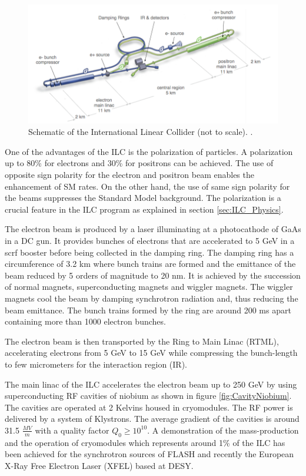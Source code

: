 \begin{figure}[htbp!]
  \centering
  \includegraphics[width=0.8\linewidth]{chap2/fig/ILC_schematic.png}
  \caption{Schematic of the International Linear Collider (not to scale). \cite{ILC_TDR_Vol1}.} \label{fig:ILC_schematic}
\end{figure}

One of the advantages of the ILC is the polarization of particles. A polarization up to 80\% for electrons and 30\% for positrons can be achieved. The use of opposite sign polarity for the electron and positron beam enables the enhancement of SM rates. On the other hand, the use of same sign polarity for the beams suppresses the Standard Model background. The polarization is a crucial feature in the ILC program as explained in section \ref{sec:ILC_Physics}.

The electron beam is produced by a laser illuminating at a photocathode of GaAs in a DC gun. It provides bunches of electrons that are accelerated to 5 GeV in a \acrshort{scrf} booster before being collected in the damping ring. The damping ring has a circumference of 3.2 km where bunch trains are formed and the emittance of the beam reduced by 5 orders of magnitude to 20 nm. It is achieved by the succession of normal magnets, superconducting magnets and wiggler magnets. The wiggler magnets cool the beam by damping synchrotron radiation and, thus reducing the beam emittance. The bunch trains formed by the ring are around 200 ms apart containing more than 1000 electron bunches.

The electron beam is then transported by the Ring to Main Linac (RTML), accelerating electrons from 5 GeV to 15 GeV while compressing the bunch-length to few micrometers for the interaction region (IR).

The main linac of the ILC accelerates the electron beam up to 250 GeV by using superconducting RF cavities of niobium as shown in figure \ref{fig:CavityNiobium}. The cavities are operated at 2 Kelvins housed in cryomodules. The RF power is delivered by a system of Klystrons. The average gradient of the cavities is around 31.5 $\frac{MV}{m}$ with a quality factor $Q_0 \geqslant 10^{10}$. A demonstration of the mass-production and the operation of cryomodules which represents around 1\% of the ILC has been achieved for the synchrotron sources of FLASH and recently the European X-Ray Free Electron Laser (XFEL) \cite{Altarelli:2006zza} based at DESY.

